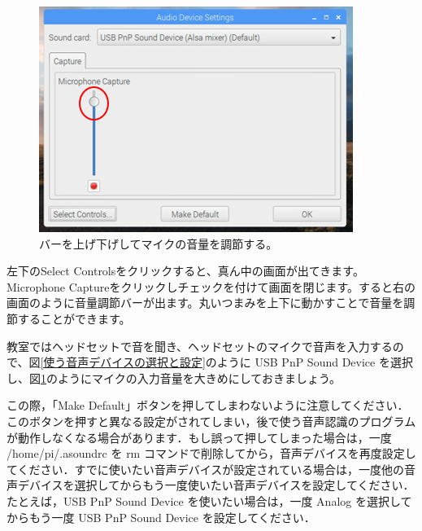\begin{figure}[H]
\begin{minipage}[t]{0.3\linewidth}
\begin{center}
    \label{音量変更2}
\end{center}
\end{minipage}
\begin{minipage}[t]{0.3\linewidth}
\begin{center}
    \includegraphics[width=\linewidth]{images/chap06/text06-img008.png}
    \caption{バーを上げ下げしてマイクの音量を調節する。}
    \label{音量変更3}
\end{center}
\end{minipage}
\end{figure}

左下のSelect Controlsをクリックすると、真ん中の画面が出てきます。Microphone Captureをクリックしチェックを付けて画面を閉じます。すると右の画面のように音量調節バーが出ます。丸いつまみを上下に動かすことで音量を調節することができます。

教室ではヘッドセットで音を聞き、ヘッドセットのマイクで音声を入力するので、図\ref{使う音声デバイスの選択と設定}のように USB PnP Sound Device を選択し、図\ref{音量変更3}のようにマイクの入力音量を大きめにしておきましょう。

この際，「Make Default」ボタンを押してしまわないように注意してください．このボタンを押すと異なる設定がされてしまい，後で使う音声認識のプログラムが動作しなくなる場合があります．もし誤って押してしまった場合は，一度 /home/pi/.asoundrc を rm コマンドで削除してから，音声デバイスを再度設定してください．すでに使いたい音声デバイスが設定されている場合は，一度他の音声デバイスを選択してからもう一度使いたい音声デバイスを設定してください．たとえば，USB PnP Sound Device を使いたい場合は，一度 Analog を選択してからもう一度 USB PnP Sound Device を設定してください．